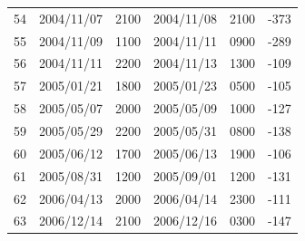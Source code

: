 \documentclass[sw, draft]{AGUTeX}
\begin{document}
\begin{table}[h]
\begin{tabular}{cccccc}
54 & 2004/11/07 & 2100 & 2004/11/08 & 2100 & -373 \\
55 & 2004/11/09 & 1100 & 2004/11/11 & 0900 & -289 \\
56 & 2004/11/11 & 2200 & 2004/11/13 & 1300 & -109 \\
57 & 2005/01/21 & 1800 & 2005/01/23 & 0500 & -105 \\
58 & 2005/05/07 & 2000 & 2005/05/09 & 1000 & -127 \\
59 & 2005/05/29 & 2200 & 2005/05/31 & 0800 & -138 \\
60 & 2005/06/12 & 1700 & 2005/06/13 & 1900 & -106 \\
61 & 2005/08/31 & 1200 & 2005/09/01 & 1200 & -131 \\
62 & 2006/04/13 & 2000 & 2006/04/14 & 2300 & -111 \\
63 & 2006/12/14 & 2100 & 2006/12/16 & 0300 & -147 \\ \hline
\end{tabular}%
\end{table}



\end{document}
